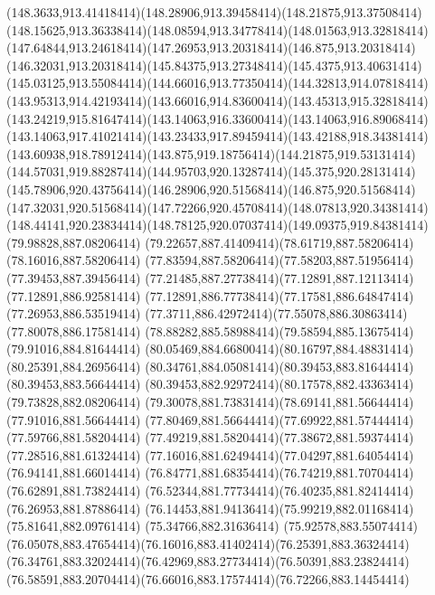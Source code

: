 {{	\curveto(148.3633,913.41418414)(148.28906,913.39458414)(148.21875,913.37508414)
	\curveto(148.15625,913.36338414)(148.08594,913.34778414)(148.01563,913.32818414)
	\curveto(147.64844,913.24618414)(147.26953,913.20318414)(146.875,913.20318414)
	\curveto(146.32031,913.20318414)(145.84375,913.27348414)(145.4375,913.40631414)
	\curveto(145.03125,913.55084414)(144.66016,913.77350414)(144.32813,914.07818414)
	\curveto(143.95313,914.42193414)(143.66016,914.83600414)(143.45313,915.32818414)
	\curveto(143.24219,915.81647414)(143.14063,916.33600414)(143.14063,916.89068414)
	\curveto(143.14063,917.41021414)(143.23433,917.89459414)(143.42188,918.34381414)
	\curveto(143.60938,918.78912414)(143.875,919.18756414)(144.21875,919.53131414)
	\curveto(144.57031,919.88287414)(144.95703,920.13287414)(145.375,920.28131414)
	\curveto(145.78906,920.43756414)(146.28906,920.51568414)(146.875,920.51568414)
	\curveto(147.32031,920.51568414)(147.72266,920.45708414)(148.07813,920.34381414)
	\curveto(148.44141,920.23834414)(148.78125,920.07037414)(149.09375,919.84381414)
	\closepath
	\moveto(79.98828,887.08206414)
	\curveto(79.22657,887.41409414)(78.61719,887.58206414)(78.16016,887.58206414)
	\curveto(77.83594,887.58206414)(77.58203,887.51956414)(77.39453,887.39456414)
	\curveto(77.21485,887.27738414)(77.12891,887.12113414)(77.12891,886.92581414)
	\curveto(77.12891,886.77738414)(77.17581,886.64847414)(77.26953,886.53519414)
	\curveto(77.3711,886.42972414)(77.55078,886.30863414)(77.80078,886.17581414)
	\curveto(78.88282,885.58988414)(79.58594,885.13675414)(79.91016,884.81644414)
	\curveto(80.05469,884.66800414)(80.16797,884.48831414)(80.25391,884.26956414)
	\curveto(80.34761,884.05081414)(80.39453,883.81644414)(80.39453,883.56644414)
	\curveto(80.39453,882.92972414)(80.17578,882.43363414)(79.73828,882.08206414)
	\curveto(79.30078,881.73831414)(78.69141,881.56644414)(77.91016,881.56644414)
	\curveto(77.80469,881.56644414)(77.69922,881.57444414)(77.59766,881.58204414)
	\curveto(77.49219,881.58204414)(77.38672,881.59374414)(77.28516,881.61324414)
	\curveto(77.16016,881.62494414)(77.04297,881.64054414)(76.94141,881.66014414)
	\curveto(76.84771,881.68354414)(76.74219,881.70704414)(76.62891,881.73824414)
	\curveto(76.52344,881.77734414)(76.40235,881.82414414)(76.26953,881.87886414)
	\curveto(76.14453,881.94136414)(75.99219,882.01168414)(75.81641,882.09761414)
	\lineto(75.34766,882.31636414)
	\lineto(75.92578,883.55074414)
	\curveto(76.05078,883.47654414)(76.16016,883.41402414)(76.25391,883.36324414)
	\curveto(76.34761,883.32024414)(76.42969,883.27734414)(76.50391,883.23824414)
	\curveto(76.58591,883.20704414)(76.66016,883.17574414)(76.72266,883.14454414)
}}
